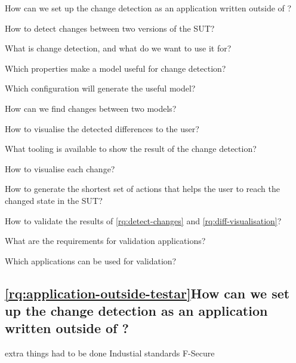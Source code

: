 \begin{questions}

    \item How can we set up the change detection as an application written outside of \testar? \label{rq:application-outside-testar}

    \item How to detect changes between two versions of the SUT? \label{rq:detect-changes}
    \begin{questions}
        \item What is change detection, and what do we want to use it for? \label{rq:what-is-change-detection}
        \item Which properties make a model useful for change detection? \label{rq:useful-detection}
        \item Which \testar configuration will generate the useful model? \label{rq:testar-config}
        \item How can we find changes between two models? \label{rq:finding-changes}
    \end{questions}


    
    \item How to visualise the detected differences to the user? \label{rq:diff-visualisation}
    \begin{questions}
        \item What tooling is available to show the result of the change detection? \label{rq:tooling}
        \item How to visualise each change? \label{rq:type-visualisation}
        \item How to generate the shortest set of actions that helps the user to reach the changed state in the SUT? \label{rq:shortest-set}    
    \end{questions}
    
    \item How to validate the results of \ref{rq:detect-changes} and \ref{rq:diff-visualisation}? \label{rq:validation}
    \begin{questions}
        \item What are the requirements for validation applications? \label{rq:req-apps}
        \item Which applications can be used for validation? \label{rq:validation-apps}
    \end{questions}
\end{questions}

\subsection{\ref{rq:application-outside-testar}How can we set up the change detection as an application written outside of \testar?}
extra things had to be done
Industial standards
F-Secure


